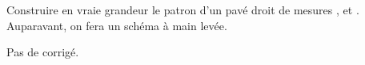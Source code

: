 
\begin{exercice*}
   Construire en vraie grandeur le patron d'un pavé droit de mesures ,  et . Auparavant, on fera un schéma à main levée.
\end{exercice*}
\begin{corrige}
   Pas de corrigé.
\end{corrige}